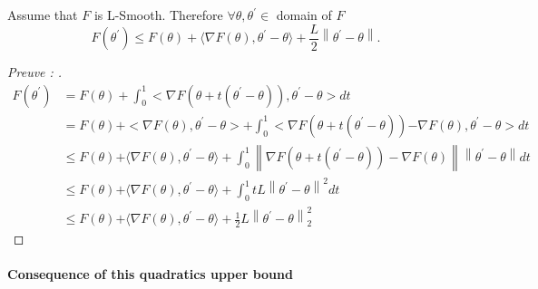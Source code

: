 \begin{lem}
    Assume that $ F $  is L-Smooth. Therefore $ \forall \theta , \theta ^\prime \in  $ domain of $ F $ 
    \[
        F(\theta ^\prime ) \leq  F(\theta ) + \langle \nabla F(\theta ) , \theta ^\prime  - \theta \rangle + \frac{L}{2} \left\| \theta ^\prime  - \theta  \right\| 
    .\]
\end{lem}
\begin{proof}[Preuve : ]
    \begin{align*}
        F (\theta ^\prime ) 
            &= F(\theta ) + \int_{0}^{1} < \nabla F(\theta  + t(\theta ^\prime - \theta )), \theta ^\prime - \theta > dt \\
            &= F(\theta ) \mathbf{+} < \nabla F(\theta ), \theta ^\prime  - \theta > + \int_{0}^{1} < \nabla F(\theta  + t(\theta ^\prime - \theta )) \mathbf{-} \nabla F(\theta ), \theta ^\prime  - \theta > dt \\
            &\leq F(\theta ) \mathbf{+} \langle \nabla F(\theta ), \theta ^\prime  - \theta \rangle + \int_{0}^{1} \left\| \nabla F(\theta + t(\theta ^\prime  - \theta )) - \nabla F(\theta ) \right\| \left\| \theta  ^\prime - \theta  \right\| dt \\
            &\leq F(\theta ) \mathbf{+} \langle \nabla F(\theta ), \theta ^\prime  - \theta \rangle + \int_{0}^{1} t L \left\| \theta ^\prime  - \theta  \right\|^2 dt \\
            &\leq F(\theta ) \mathbf{+} \langle \nabla F(\theta ), \theta ^\prime  - \theta \rangle + \frac{1}{2} L \left\| \theta  ^\prime  - \theta  \right\| ^2 _2
    \end{align*}
\end{proof}

\paragraph*{Consequence of this quadratics upper bound }

